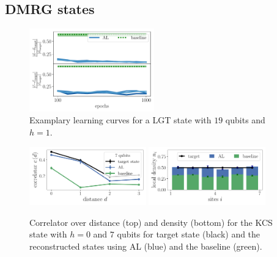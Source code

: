 \documentclass[pra,aps,showpacs,groupedaddress,superscriptaddress,twocolumn,toc=flat,biblatex,footinbib]{revtex4-1}
\begin{document}
\subsection{DMRG states \label{appendix:MPS}}



\begin{figure}[t]
	\centering
  \includegraphics[width=0.48\textwidth]{Paper/Graphics/LGT_h=1_finite_mu_allquantities_19_qubits_summary.pdf}
	\caption[]{Examplary learning curves for a LGT state with $19$ qubits and $h=1$.}
	\label{fig:Example4}
\end{figure}

\begin{figure}[t]
	\centering
   \includegraphics[width=0.45\textwidth]{Paper/Graphics/LGT_different_threshold_correlator_7_qubits.pdf}
   \includegraphics[width=0.45\textwidth]{Paper/Graphics/LGT_different_threshold_density_7_qubits.pdf}
	\caption[]{Correlator over distance (top) and density (bottom) for the KCS state with $h=0$ and $7$ qubits for target state (black) and the reconstructed states using AL (blue) and the baseline (green).}
	\label{fig:LGT_h=0_3}
\end{figure}
\end{document}
